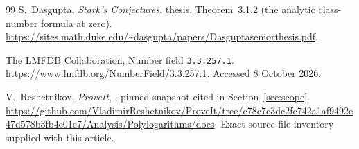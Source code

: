 \documentclass[11pt]{article}
\numberwithin{equation}{section}
\theoremstyle{definition}
\theoremstyle{remark}
\begin{document}
\begin{thebibliography}{99}
S.~Dasgupta,
\emph{Stark's Conjectures}, thesis, Theorem~3.1.2
(the analytic class-number formula at zero).
\url{https://sites.math.duke.edu/~dasgupta/papers/Dasguptaseniorthesis.pdf}.

The LMFDB Collaboration,
Number field \texttt{3.3.257.1}.
\url{https://www.lmfdb.org/NumberField/3.3.257.1}.
Accessed 8 October 2026.

V.~Reshetnikov,
\emph{ProveIt}, ,
pinned snapshot cited in Section~\ref{sec:scope}.
\url{https://github.com/VladimirReshetnikov/ProveIt/tree/c78c7c3dc2fc742a1af9492e47d578b3fb4e01e7/Analysis/Polylogarithms/docs}.
Exact source file inventory supplied with this article.

\end{thebibliography}
\end{document}
